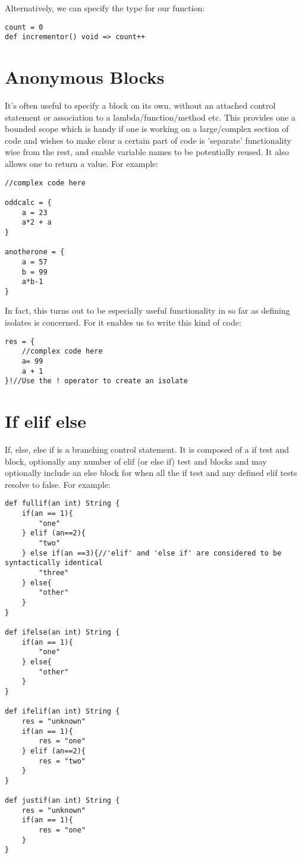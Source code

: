 \documentclass[conc-doc]{subfiles}
\begin{document}
Alternatively, we can specify the type for our function:
\begin{lstlisting}
count = 0
def incrementor() void => count++
\end{lstlisting}

\section{Anonymous Blocks}
It's often useful to specify a block on its own, without an attached control statement or association to a lambda/function/method etc. This provides one a bounded scope which is handy if one is working on a large/complex section of code and wishes to make clear a certain part of code is 'separate' functionality wise from the rest, and enable variable names to be potentially reused. It also allows one to return a value. For example:

\begin{lstlisting}
//complex code here

oddcalc = {
	a = 23
	a*2 + a
}

anotherone = {
	a = 57
	b = 99
	a*b-1
}
\end{lstlisting}

In fact, this turns out to be especially useful functionality in so far as defining isolates is concerned. For it enables us to write this kind of code:
\begin{lstlisting}
res = {
	//complex code here
	a= 99
	a + 1
}!//Use the ! operator to create an isolate
\end{lstlisting}

\section{If elif else}
If, else, else if is a branching control statement. It is composed of a if test and block, optionally any number of elif  (or else if) test and blocks and may optionally include an else block for when all the if test and any defined elif tests resolve to false. For example:

\begin{lstlisting}
def fullif(an int) String {
	if(an == 1){
		"one"
	} elif (an==2){
		"two"
	} else if(an ==3){//'elif' and 'else if' are considered to be syntactically identical
		"three"
	} else{
		"other"
	}
}

def ifelse(an int) String {
	if(an == 1){
		"one"
	} else{
		"other"
	}
}

def ifelif(an int) String {
	res = "unknown"
	if(an == 1){
		res = "one"
	} elif (an==2){
		res = "two"
	}
}

def justif(an int) String {
	res = "unknown"
	if(an == 1){
		res = "one"
	}
}
\end{lstlisting}
\end{document}
